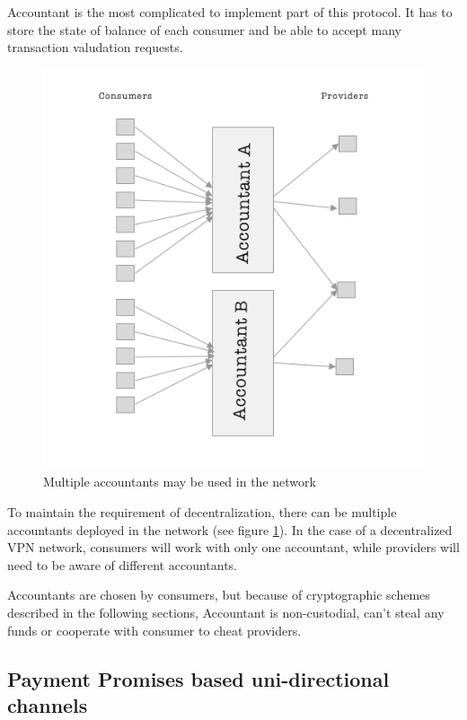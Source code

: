 \documentclass[a4paper,12pt]{article}
\begin{document}
Accountant is the most complicated to implement part of this protocol. It has
to store the state of balance of each consumer and be able to accept many 
transaction valudation requests.

\begin{figure}[H]
    \centering
    \includegraphics[scale=0.5]{../img/multi-accountants}
    \caption{Multiple accountants may be used in the network}
    \label{img:multi-accountants}
\end{figure}

To maintain the requirement of decentralization, there can be multiple accountants 
deployed in the network (see figure \ref{img:multi-accountants}). In the case of a 
decentralized VPN network, consumers will work with only one accountant, while 
providers will need to be aware of different accountants. 

Accountants are chosen by consumers, but because of cryptographic schemes described 
in the following sections, Accountant is non-custodial, can’t steal any funds or 
cooperate with consumer to cheat providers.

\subsection{Payment Promises based uni-directional channels}
\end{document}
